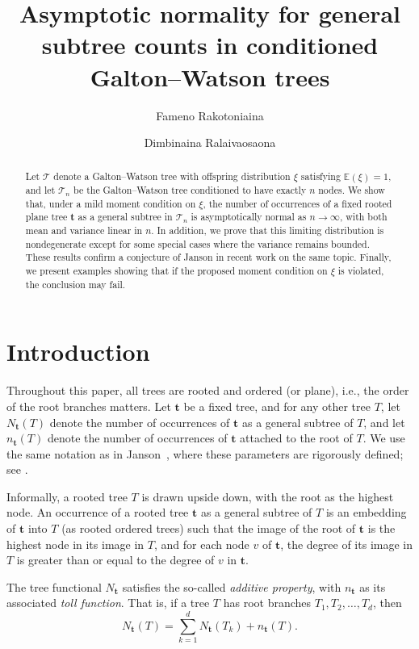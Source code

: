 \documentclass[article]{amsart}
\title{Asymptotic normality for general subtree counts in  conditioned Galton--Watson trees}
\author{Fameno Rakotoniaina }
\author{Dimbinaina Ralaivaosaona}
\newcommand{\st}{\textbf{t}}
\newcommand{\N}{N_{\st}}
\newcommand{\n}{n_{\st}}
\theoremstyle{definition}
\theoremstyle{remark}
\begin{document}
\begin{abstract}

Let $\mathcal{T}$ denote a Galton--Watson tree with offspring distribution $\xi$ satisfying $\mathbb{E}(\xi)  = 1$, and let $\mathcal{T}_n$ be the Galton--Watson tree conditioned to have exactly $n$ nodes. We show that, under a mild moment condition on $\xi$, the number of occurrences of a fixed rooted plane tree $\mathbf{t}$ as a general subtree in $\mathcal{T}_n$ is asymptotically normal as $n \to \infty$, with both mean and variance linear in $n$. In addition, we prove that this limiting distribution is nondegenerate except for some special cases where the variance remains bounded. These results confirm a conjecture of Janson in recent work on the same topic. Finally, we present examples showing that if the proposed moment condition on $\xi$ is violated, the conclusion may fail.

\end{abstract}


\maketitle


\section{Introduction}
  
Throughout this paper, all trees are rooted and ordered (or plane), i.e., the order of the root branches matters. Let $\st$ be a fixed tree, and for any other tree $T$, let $\N(T)$ denote the number of occurrences of $\st$ as a general subtree of $T$, and let $\n(T)$ denote the number of occurrences of $\st$ attached to the root of $T$. We use the same notation as in Janson~\cite{J21}, where these parameters are rigorously defined; see \cite[Section~2]{J21}.

Informally, a rooted tree $T$ is drawn upside down, with the root as the highest node. An occurrence of a rooted tree $\st$ as a general subtree of $T$ is an embedding of $\st$ into $T$ (as rooted ordered trees) such that the image of the root of $\st$ is the highest node in its image in $T$, and for each node $v$ of $\st$, the degree of its image in $T$ is greater than or equal to the degree of $v$ in $\st$.

The tree functional $\N$ satisfies the so-called \emph{additive property}, with $\n$ as its associated \emph{toll function}. That is, if a tree $T$ has root branches $T_1, T_2, \dots, T_d$, then
\[
\N(T)=\sum_{k=1}^{d} \N(T_k) + \n(T).
\]
\end{document}
